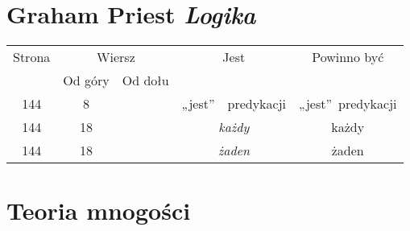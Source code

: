 \documentclass[a4paper,11pt]{article}
\numberwithin{equation}{section}
\begin{document}
\newpage

\section{Graham Priest \textit{Logika}}





\begin{center}

  \begin{tabular}{|c|c|c|c|c|}
    \hline
    Strona & \multicolumn{2}{c|}{Wiersz} & Jest
    & Powinno być \\ \cline{2-3}
           & Od góry & Od dołu & & \\
    \hline
    144 & \hphantom{0}8 & & „jest”~~predykacji & „jest”~predykacji \\
    144 & 18 & & \textit{każdy} & każdy \\
    144 & 18 & & \textit{żaden} & żaden \\
    \hline
  \end{tabular}

\end{center}

\VerSpaceSix


















\newpage
\section{Teoria mnogości}















\printbibliography





\end{document}

